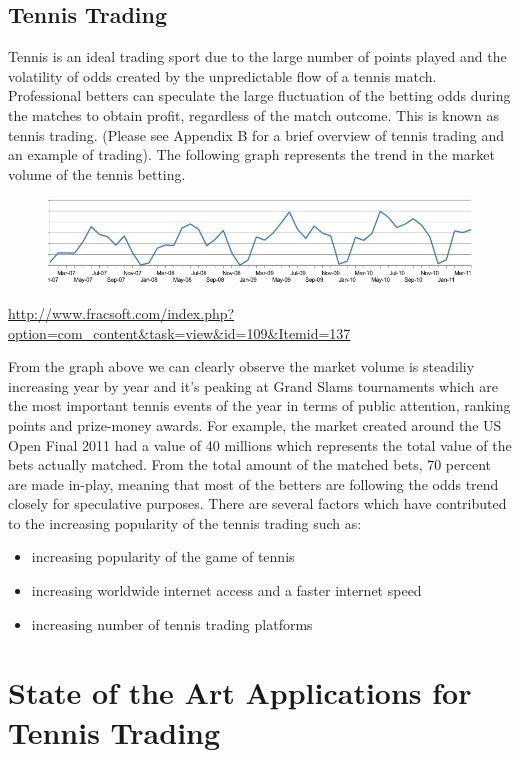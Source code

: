\documentclass[10pt]{report}
\begin{document}
\subsection{Tennis Trading}

Tennis is an ideal trading sport due to the large number of points played and the volatility of odds created
by the unpredictable flow of a tennis match. Professional betters can speculate the large
fluctuation of the betting odds during the matches to obtain profit, regardless of
the match outcome. This is known as tennis trading. (Please see Appendix B for a brief overview of tennis trading and an example of trading).
The following graph represents the trend in the market volume of the tennis betting.

\begin{figure}[ht]
\centering
\includegraphics[scale=0.4]{bftennis.jpg}
\caption{}
\end{figure}
\url {http://www.fracsoft.com/index.php?option=com_content&task=view&id=109&Itemid=137}

From the graph above we can clearly observe the market volume is steadiliy increasing year by year and it's peaking at 
Grand Slams tournaments which are the most important tennis events of the year in terms of public attention, ranking points and prize-money awards.
For example, the market created around the US Open Final 2011 had a value of 40 millions which represents the total value of the bets actually matched.
From the total amount of the matched bets, 70 percent are made in-play, meaning that most of the betters are following the odds trend closely for 
speculative purposes. 
There are several factors which have contributed to the increasing popularity of the tennis trading such as:
\begin{itemize}
\item increasing popularity of the game of tennis 
\item increasing worldwide internet access and a faster internet speed  
\item increasing number of tennis trading platforms
\end{itemize}



\section{State of the Art Applications for Tennis Trading}
\end{document}
